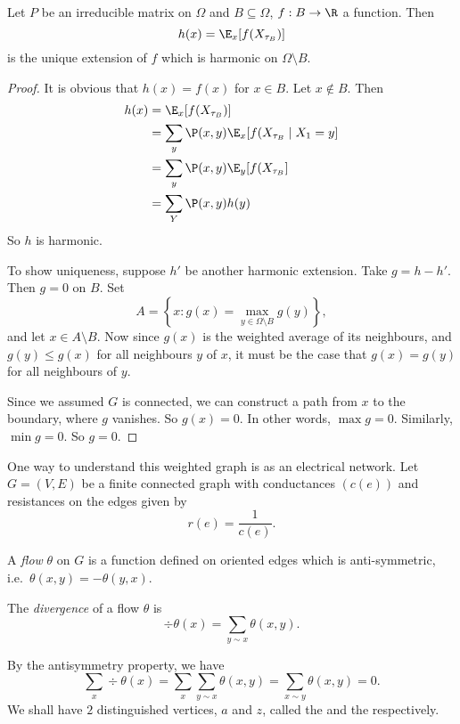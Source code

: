 \documentclass[a4paper]{article}
\begin{document}
\begin{prop}
  Let $P$ be an irreducible matrix on $\Omega$ and $B \subseteq \Omega$, $f: B \to \R$ a function. Then
  \[
    h(x) = \E_x [f(X_{\tau_B})]
  \]
  is the unique extension of $f$ which is harmonic on $\Omega \setminus B$.
\end{prop}

\begin{proof}
  It is obvious that $h(x) = f(x)$ for $x \in B$. Let $x \not\in B$. Then
  \begin{align*}
    h(x) &= \E_x [f(X_{\tau_B})] \\
    &= \sum_y \P(x, y) \E_x[f(X_{\tau_B} \mid X_1 = y]\\
    &= \sum_y \P(x, y) \E_y[f(X_{\tau_B}]\\
    &= \sum_Y \P(x, y) h(y)
  \end{align*}
  So $h$ is harmonic.

  To show uniqueness, suppose $h'$ be another harmonic extension. Take $g = h - h'$. Then $g = 0$ on $B$. Set
  \[
    A = \left\{x: g(x) = \max_{y \in \Omega \setminus B} g(y) \right\},
  \]
  and let $x \in A \setminus B$. Now since $g(x)$ is the weighted average of its neighbours, and $g(y) \leq g(x)$ for all neighbours $y$ of $x$, it must be the case that $g(x) = g(y)$ for all neighbours of $y$.

  Since we assumed $G$ is connected, we can construct a path from $x$ to the boundary, where $g$ vanishes. So $g(x) = 0$. In other words, $\max g = 0$. Similarly, $\min g = 0$. So $g = 0$.
\end{proof}

One way to understand this weighted graph is as an electrical network. Let $G = (V, E)$ be a finite connected graph with conductances $(c(e))$ and resistances on the edges given by
\[
  r(e) = \frac{1}{c(e)}.
\]
\begin{defi}[Flow]
  A \emph{flow} $\theta$ on $G$ is a function defined on oriented edges which is anti-symmetric, i.e.\ $\theta(x, y) = - \theta(y, x)$.
\end{defi}

\begin{defi}[Divergence]
  The \emph{divergence} of a flow $\theta$ is
  \[
    \div \theta (x) = \sum_{y \sim x} \theta(x, y).
  \]
\end{defi}
By the antisymmetry property, we have
\[
  \sum_x \div \theta(x) = \sum_x \sum_{y \sim x} \theta(x, y) = \sum_{x \sim y} \theta(x, y) = 0.
\]
We shall have $2$ distinguished vertices, $a$ and $z$, called the  and the  respectively.
\end{document}

